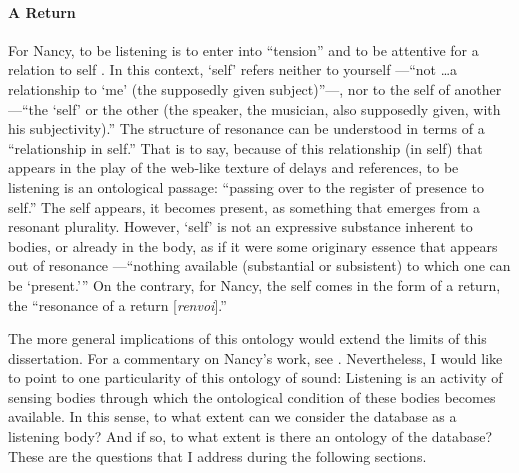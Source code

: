 \paragraph{A Return}
For Nancy, to be listening is to enter into ``tension'' and to be attentive for a relation to self \parencite[12][All subsequent quotes from this passage.]{Nan07:Lis}. In this context, `self' refers neither to yourself ---``not \dots a relationship to `me' (the supposedly given subject)''---, nor to the self of another ---``the `self' or the other (the speaker, the musician, also supposedly given, with his subjectivity).'' The structure of resonance can be understood in terms of a ``relationship in self.'' That is to say, because of this relationship (in self) that appears in the play of the web-like texture of delays and references, to be listening is an ontological passage: ``passing over to the register of presence to self.'' The self appears, it becomes present, as something that emerges from a resonant plurality. However, `self' is not an expressive substance inherent to bodies, or already in the body, as if it were some originary essence that appears out of resonance ---``nothing available (substantial or subsistent) to which one can be `present.''' On the contrary, for Nancy, the self comes in the form of a return, the ``resonance of a return [\textit{renvoi}].'' 

The more general implications of this ontology would extend the limits of this dissertation. For a commentary on Nancy's work, see \textcite{Gra15:The}. Nevertheless, I would like to point to one particularity of this ontology of sound: Listening is an activity of sensing bodies through which the ontological condition of these bodies becomes available. In this sense, to what extent can we consider the database as a listening body? And if so, to what extent is there an ontology of the database? These are the questions that I address during the following sections.

